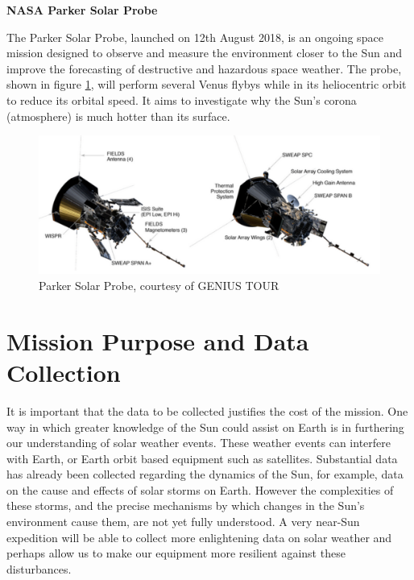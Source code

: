\documentclass[12pt]{article}
\begin{document}
\vspace{\baselineskip}
\textbf{NASA Parker Solar Probe}
\vspace{\baselineskip}

The Parker Solar Probe, launched on 12th August 2018, is an ongoing space mission designed to observe and measure the environment closer to the Sun and improve the forecasting of destructive and hazardous space weather. The probe, shown in figure \ref{psp_diagram}, will perform several Venus flybys while in its heliocentric orbit to reduce its orbital speed. It aims to investigate why the Sun’s corona (atmosphere) is much hotter than its surface. 

\begin{figure}[H]
    \centering
    \includegraphics[width = 12cm]{Media/Document/psp.PNG}
    \caption{Parker Solar Probe, courtesy of GENIUS TOUR}
    \label{psp_diagram}
\end{figure}


\label{Introduction Section} 

 



\section{Mission Purpose and Data Collection} \label{data}

It is important that the data to be collected justifies the cost of the mission. One way in which greater knowledge of the Sun could assist on Earth is in furthering our understanding of solar weather events. These weather events can interfere with Earth, or Earth orbit based equipment such as satellites. Substantial data has already been collected regarding the dynamics of the Sun, for example, data on the cause and effects of solar storms on Earth. However the complexities of these storms, and the precise mechanisms by which changes in the Sun's environment cause them, are not yet fully understood. A very near-Sun expedition will be able to collect more enlightening data on solar weather and perhaps allow us to make our equipment more resilient against these disturbances. 
\end{document}
